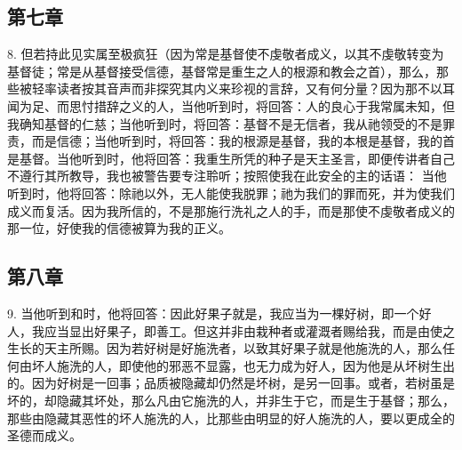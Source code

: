 \subsection{第七章}

8. 但若持此见实属至极疯狂（因为常是基督使不虔敬者成义，以其不虔敬转变为基督徒；常是从基督接受信德，基督常是重生之人的根源和教会之首），那么，那些被轻率读者按其音声而非探究其内义来珍视的言辞，又有何分量？因为那不以耳闻为足、而思忖措辞之义的人，当他听到时，将回答：人的良心于我常属未知，但我确知基督的仁慈；当他听到时，将回答：基督不是无信者，我从祂领受的不是罪责，而是信德；当他听到时，将回答：我的根源是基督，我的本根是基督，我的首是基督。当他听到时，他将回答：我重生所凭的种子是天主圣言，即便传讲者自己不遵行其所教导，我也被警告要专注聆听；按照使我在此安全的主的话语： 当他听到时，他将回答：除祂以外，无人能使我脱罪；祂为我们的罪而死，并为使我们成义而复活。因为我所信的，不是那施行洗礼之人的手，而是那使不虔敬者成义的那一位，好使我的信德被算为我的正义。\par


\subsection{第八章}

9. 当他听到和时，他将回答：因此好果子就是，我应当为一棵好树，即一个好人，我应当显出好果子，即善工。但这并非由栽种者或灌溉者赐给我，而是由使之生长的天主所赐。因为若好树是好施洗者，以致其好果子就是他施洗的人，那么任何由坏人施洗的人，即使他的邪恶不显露，也无力成为好人，因为他是从坏树生出的。因为好树是一回事；品质被隐藏却仍然是坏树，是另一回事。或者，若树虽是坏的，却隐藏其坏处，那么凡由它施洗的人，并非生于它，而是生于基督；那么，那些由隐藏其恶性的坏人施洗的人，比那些由明显的好人施洗的人，要以更成全的圣德而成义。\par



